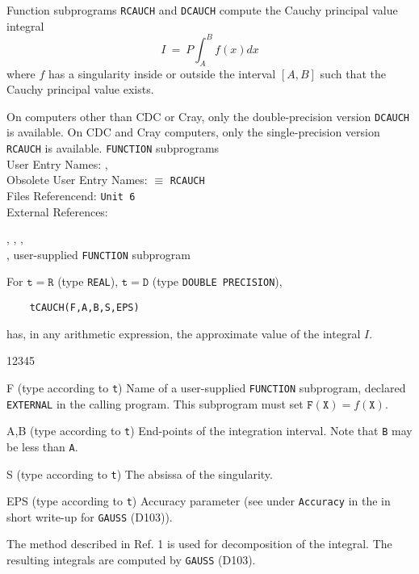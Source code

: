                
           
\Submitter{}                     
               
Function subprograms {\tt RCAUCH} and {\tt DCAUCH}
compute the Cauchy principal value integral
$$ I \ = \ P \int_A^B f(x)dx $$
where $f$ has a singularity inside or outside the interval
$[A,B]$ such that the Cauchy principal value exists.
\par
On computers other than CDC or Cray, only
the double-precision version {\tt DCAUCH} is available.
On CDC and  Cray computers, only the single-precision version
{\tt RCAUCH} is available.
\Structure
{\tt FUNCTION} subprograms \\
User Entry Names: , \\
Obsolete User Entry Names:  $\equiv$ {\tt RCAUCH} \\
Files Referencend: {\tt Unit 6} \\
External References: \parbox[t]{100mm}{
, ,
, \\
, user-supplied {\tt  FUNCTION} subprogram}
\Usage
For $\mathtt{t=R}$ (type {\tt REAL}), $\mathtt{t=D}$ (type
{\tt DOUBLE PRECISION}),
\begin{verbatim}
    tCAUCH(F,A,B,S,EPS)
\end{verbatim}
has, in any arithmetic expression, the approximate value of the
integral $I$.
\begin{DLtt}{12345}
\item [F] (type according to {\tt t})
Name of a user-supplied {\tt FUNCTION} subprogram, declared
{\tt EXTERNAL} in the calling program. This subprogram must set
$\mathtt{F(X)} = f(\mathtt{X})$.
\item [A,B] (type according to {\tt t}) End-points of the integration
interval. Note that {\tt B} may be less than {\tt A}.
\item [S] (type according to {\tt t}) The absissa of the singularity.
\item [EPS]
(type according to {\tt t}) Accuracy parameter (see under
{\tt Accuracy} in the in short write-up for {\tt GAUSS} (D103)).
\end{DLtt}
\Method
The method described in  Ref. 1 is used for
decomposition of the integral. The resulting integrals are
computed by {\tt GAUSS} (D103).
